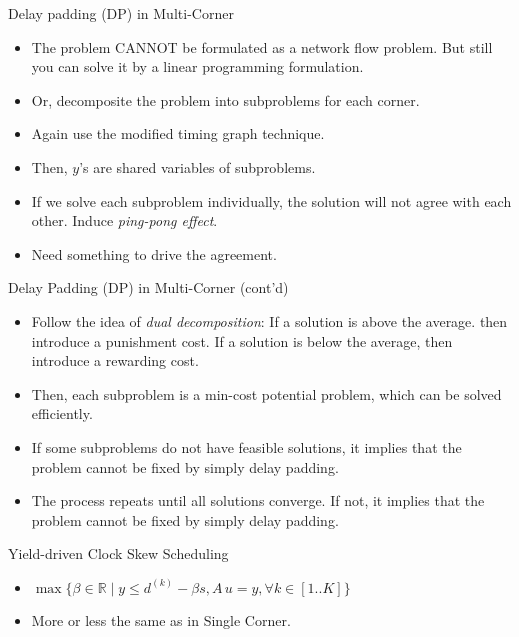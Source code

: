 \documentclass[10pt,ignorenonframetext,mathserif,onlymath]{beamer}
\providecommand{\tightlist}{%
  \setlength{\itemsep}{0pt}\setlength{\parskip}{0pt}}
\begin{document}
\begin{frame}{Delay padding (DP) in Multi-Corner}
\protect\hypertarget{delay-padding-dp-in-multi-corner}{}

\begin{itemize}
\tightlist
\item
  The problem CANNOT be formulated as a network flow problem. But still
  you can solve it by a linear programming formulation.
\item
  Or, decomposite the problem into subproblems for each corner.
\item
  Again use the modified timing graph technique.
\item
  Then, \(y\)’s are shared variables of subproblems.
\item
  If we solve each subproblem individually, the solution will not agree
  with each other. Induce \emph{ping-pong effect}.
\item
  Need something to drive the agreement.
\end{itemize}

\end{frame}

\begin{frame}{Delay Padding (DP) in Multi-Corner (cont’d)}
\protect\hypertarget{delay-padding-dp-in-multi-corner-contd}{}

\begin{itemize}
\tightlist
\item
  Follow the idea of \emph{dual decomposition}: If a solution is above
  the average. then introduce a punishment cost. If a solution is below
  the average, then introduce a rewarding cost.
\item
  Then, each subproblem is a min-cost potential problem, which can be
  solved efficiently.
\item
  If some subproblems do not have feasible solutions, it implies that
  the problem cannot be fixed by simply delay padding.
\item
  The process repeats until all solutions converge. If not, it implies
  that the problem cannot be fixed by simply delay padding.
\end{itemize}

\end{frame}

\begin{frame}{Yield-driven Clock Skew Scheduling}
\protect\hypertarget{yield-driven-clock-skew-scheduling-1}{}

\begin{itemize}
\tightlist
\item
  \(\max\{\beta \in \mathbb{R} \mid y \leq d^{(k)} - \beta s, A\,u = y, \forall k\in[1..K]\}\)
\item
  More or less the same as in Single Corner.
\end{itemize}

\end{frame}
\end{document}
